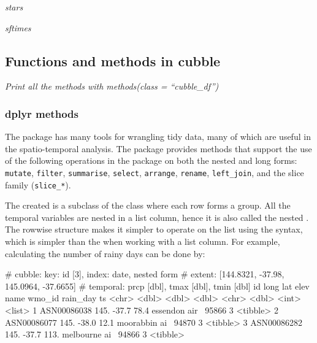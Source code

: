 \documentclass[
  shortnames]{jss}
\begin{document}
\emph{stars}

\emph{sftimes}

\hypertarget{functions-and-methods-in-cubble}{%
\subsection{Functions and methods in cubble}\label{functions-and-methods-in-cubble}}

\emph{Print all the methods with methods(class = ``cubble\_df'')}

\hypertarget{dplyr-methods}{%
\subsubsection{dplyr methods}\label{dplyr-methods}}

The  package has many tools for wrangling tidy data, many of which are useful in the spatio-temporal analysis. The  package provides methods that support the use of the following operations in the  package on both the nested and long forms: \texttt{mutate}, \texttt{filter}, \texttt{summarise}, \texttt{select}, \texttt{arrange}, \texttt{rename}, \texttt{left\_join}, and the slice family (\texttt{slice\_*}).

The created  is a subclass of the  class where each row forms a group. All the temporal variables are nested in a list column, hence it is also called the nested . The rowwise structure makes it simpler to operate on the list using the  syntax, which is simpler than the  when working with a list column. For example, calculating the number of rainy days can be done by:

\begin{CodeChunk}
\begin{CodeOutput}
# cubble:   key: id [3], index: date, nested form
# extent:   [144.8321, -37.98, 145.0964, -37.6655]
# temporal: prcp [dbl], tmax [dbl], tmin [dbl]
  id           long   lat  elev name          wmo_id rain_day ts      
  <chr>       <dbl> <dbl> <dbl> <chr>          <dbl>    <int> <list>  
1 ASN00086038  145. -37.7  78.4 essendon air~  95866        3 <tibble>
2 ASN00086077  145. -38.0  12.1 moorabbin ai~  94870        3 <tibble>
3 ASN00086282  145. -37.7 113.  melbourne ai~  94866        3 <tibble>
\end{CodeOutput}
\end{CodeChunk}
\end{document}
